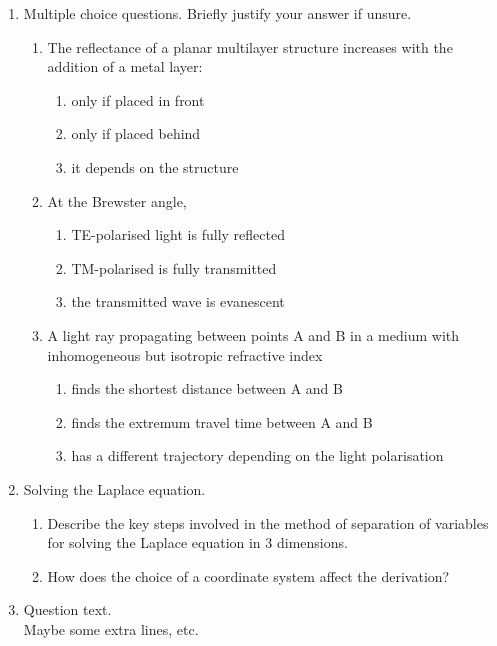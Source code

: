 \documentclass[12pt,a4paper]{article}
\providecommand{\tightlist}{%
  \setlength{\itemsep}{0pt}\setlength{\parskip}{0pt}}\usepackage{longtable,booktabs,array}
\providecommand{\tightlist}{%
  \setlength{\itemsep}{0pt}\setlength{\parskip}{2pt}}
\newcommand*{\rmarkcases}[1]{\IfStrEq{#1}{1}{[#1 mark]}{[#1 marks]}}%
\providecommand{\rmark}[1]{%
\begin{flushright}%
  \textbf{\rmarkcases{#1}}%
\end{flushright}%
}
\begin{document}
\begin{enumerate}
\def\labelenumi{\arabic{enumi}.}
\item
  Multiple choice questions. Briefly justify your answer if unsure.

  \begin{enumerate}
  \tightlist
  \item
    The reflectance of a planar multilayer structure increases with the
    addition of a metal layer:

    \begin{enumerate}
    \tightlist
    \item
      only if placed in front
    \item
      only if placed behind
    \item
      it depends on the structure
    \end{enumerate}
  \item
    At the Brewster angle,

    \begin{enumerate}
    \tightlist
    \item
      TE-polarised light is fully reflected
    \item
      TM-polarised is fully transmitted
    \item
      the transmitted wave is evanescent
    \end{enumerate}
  \item
    A light ray propagating between points A and B in a medium with
    inhomogeneous but isotropic refractive index

    \begin{enumerate}
    \tightlist
    \item
      finds the shortest distance between A and B
    \item
      finds the extremum travel time between A and B
    \item
      has a different trajectory depending on the light polarisation
      \rmark{8}
    \end{enumerate}
  \end{enumerate}
\item
  Solving the Laplace equation.

  \begin{enumerate}
  \tightlist
  \item
    Describe the key steps involved in the method of separation of
    variables for solving the Laplace equation in 3 dimensions.
  \item
    How does the choice of a coordinate system affect the derivation?
    \rmark{5}
  \end{enumerate}
\item
  Question text.\\
  Maybe some extra lines, etc.


\end{enumerate}
\end{document}
